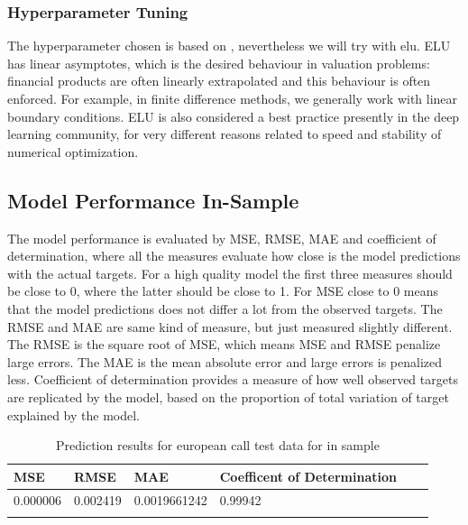 \subsubsection{Hyperparameter Tuning}


The hyperparameter chosen is based on \parencite{HirsaAli2019}, nevertheless we will try with elu. ELU has linear asymptotes, which is the desired behaviour in valuation problems: financial products are often linearly extrapolated and this behaviour is often enforced. For example, in finite difference methods, we generally work with linear boundary conditions. ELU is also considered a best practice presently in the deep learning community, for very different reasons related to speed and stability of numerical optimization.



\subsection{Model Performance In-Sample}
The model performance is evaluated by MSE, RMSE, MAE and coefficient of determination, where all the measures evaluate how close is the model predictions with the actual targets. For a high quality model the first three measures should be close to 0, where the latter should be close to 1. For MSE close to 0 means that the model predictions does not differ a lot from the observed targets. The RMSE and MAE are same kind of measure, but just measured slightly different. The RMSE is the square root of MSE, which means MSE and RMSE penalize large errors. The MAE is the mean absolute error and large errors is penalized less. Coefficient of determination provides a measure of how well observed targets are replicated by the model, based on the proportion of total variation of target explained by the model.

\begin{table}[th]
\caption{Prediction results for european call test data for in sample}
\label{tab:euroParRange}
\centering
\begin{tabular}{l l l l l l }
\toprule
\textbf{MSE} & \textbf{RMSE} & \textbf{MAE} & \textbf{Coefficent of Determination} \\
\midrule
0.000006 & 0.002419 & 0.0019661242 & 0.99942\\
\bottomrule\\
\end{tabular}
\end{table}

